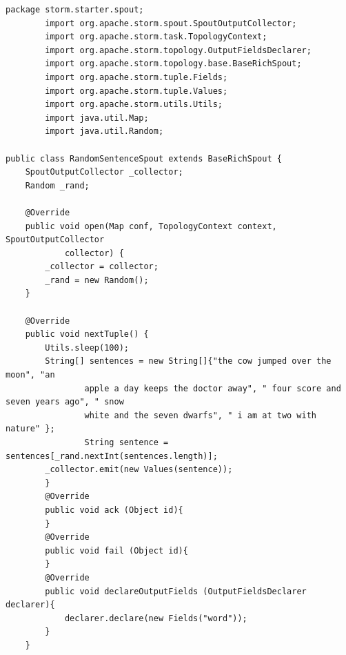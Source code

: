 \documentclass{hcmutarticle}
\begin{document}
\begin{lstlisting}
package storm.starter.spout;
        import org.apache.storm.spout.SpoutOutputCollector;
        import org.apache.storm.task.TopologyContext;
        import org.apache.storm.topology.OutputFieldsDeclarer;
        import org.apache.storm.topology.base.BaseRichSpout;
        import org.apache.storm.tuple.Fields;
        import org.apache.storm.tuple.Values;
        import org.apache.storm.utils.Utils;
        import java.util.Map;
        import java.util.Random;

public class RandomSentenceSpout extends BaseRichSpout {
    SpoutOutputCollector _collector;
    Random _rand;

    @Override
    public void open(Map conf, TopologyContext context, SpoutOutputCollector
            collector) {
        _collector = collector;
        _rand = new Random();
    }

    @Override
    public void nextTuple() {
        Utils.sleep(100);
        String[] sentences = new String[]{"the cow jumped over the moon", "an
                apple a day keeps the doctor away", " four score and seven years ago", " snow
                white and the seven dwarfs", " i am at two with nature" };
                String sentence = sentences[_rand.nextInt(sentences.length)];
        _collector.emit(new Values(sentence));
        }
        @Override
        public void ack (Object id){
        }
        @Override
        public void fail (Object id){
        }
        @Override
        public void declareOutputFields (OutputFieldsDeclarer declarer){
            declarer.declare(new Fields("word"));
        }
    }
\end{lstlisting}
\end{document}

